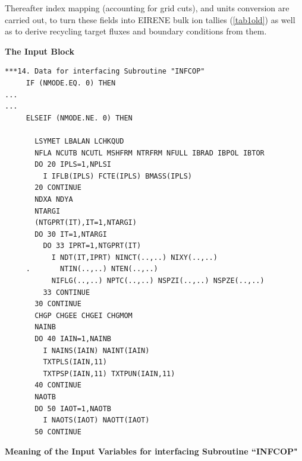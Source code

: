 Thereafter index mapping (accounting for grid cuts), and units conversion are
carried out,  to turn these fields into EIRENE bulk ion tallies
(\cref{tab1old}) as well as to derive recycling target fluxes and boundary
conditions from them.

\textbf{The Input Block}

\begin{lstlisting}
***14. Data for interfacing Subroutine "INFCOP"
     IF (NMODE.EQ. 0) THEN
...
...
     ELSEIF (NMODE.NE. 0) THEN

       LSYMET LBALAN LCHKQUD
       NFLA NCUTB NCUTL MSHFRM NTRFRM NFULL IBRAD IBPOL IBTOR
       DO 20 IPLS=1,NPLSI
         I IFLB(IPLS) FCTE(IPLS) BMASS(IPLS)
       20 CONTINUE
       NDXA NDYA
       NTARGI
       (NTGPRT(IT),IT=1,NTARGI)
       DO 30 IT=1,NTARGI
         DO 33 IPRT=1,NTGPRT(IT)
           I NDT(IT,IPRT) NINCT(..,..) NIXY(..,..)
     .       NTIN(..,..) NTEN(..,..)
           NIFLG(..,..) NPTC(..,..) NSPZI(..,..) NSPZE(..,..)
         33 CONTINUE
       30 CONTINUE
       CHGP CHGEE CHGEI CHGMOM
       NAINB
       DO 40 IAIN=1,NAINB
         I NAINS(IAIN) NAINT(IAIN)
         TXTPLS(IAIN,11)
         TXTPSP(IAIN,11) TXTPUN(IAIN,11)
       40 CONTINUE
       NAOTB
       DO 50 IAOT=1,NAOTB
         I NAOTS(IAOT) NAOTT(IAOT)
       50 CONTINUE
\end{lstlisting}

\textbf{Meaning of the Input Variables for interfacing Subroutine ``INFCOP"}

\medskip

